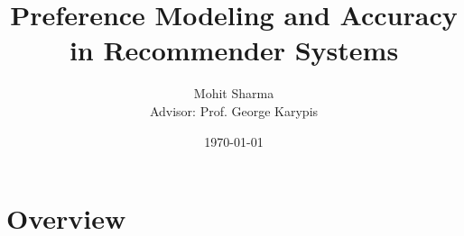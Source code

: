 \documentclass[t,xcolor={dvipsnames,usenames}]{beamer}
\title{Preference Modeling and Accuracy in Recommender Systems}
\author{Mohit Sharma\\Advisor: Prof. George Karypis}
\institute{
  University of Minnesota\\
  \url{mohit@cs.umn.edu}
}
\date{\today}
\begin{document}
\begin{frame}
  \titlepage
\end{frame}



\section{Overview}






 \begin{frame}
     \printbibliography
 \end{frame} 
\end{document}
